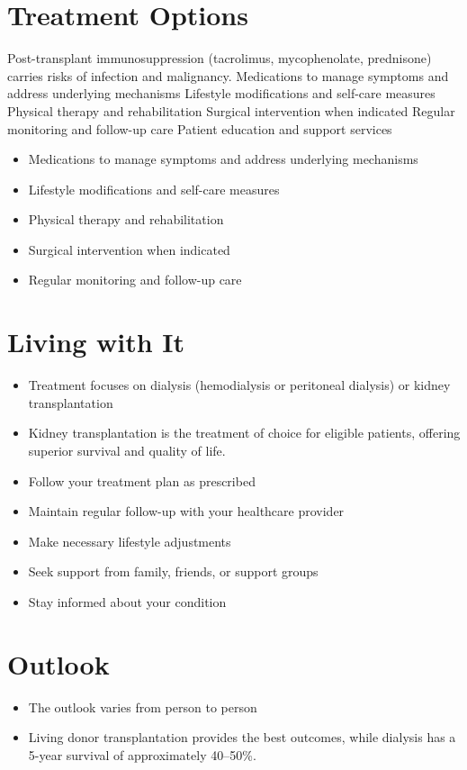 \section{Treatment Options}
Post-transplant immunosuppression (tacrolimus, mycophenolate, prednisone) carries risks of infection and malignancy. Medications to manage symptoms and address underlying mechanisms Lifestyle modifications and self-care measures Physical therapy and rehabilitation Surgical intervention when indicated Regular monitoring and follow-up care Patient education and support services

\begin{itemize}[noitemsep]
  \item Medications to manage symptoms and address underlying mechanisms
  \item Lifestyle modifications and self-care measures
  \item Physical therapy and rehabilitation
  \item Surgical intervention when indicated
  \item Regular monitoring and follow-up care
\end{itemize}
\section{Living with It}
\begin{itemize}[noitemsep]
  \item Treatment focuses on dialysis (hemodialysis or peritoneal dialysis) or kidney transplantation
  \item Kidney transplantation is the treatment of choice for eligible patients, offering superior survival and quality of life.
  \item Follow your treatment plan as prescribed
  \item Maintain regular follow-up with your healthcare provider
  \item Make necessary lifestyle adjustments
  \item Seek support from family, friends, or support groups
  \item Stay informed about your condition
\end{itemize}
\section{Outlook}
\begin{itemize}[noitemsep]
  \item The outlook varies from person to person
  \item Living donor transplantation provides the best outcomes, while dialysis has a 5-year survival of approximately 40--50\%.
\end{itemize}
